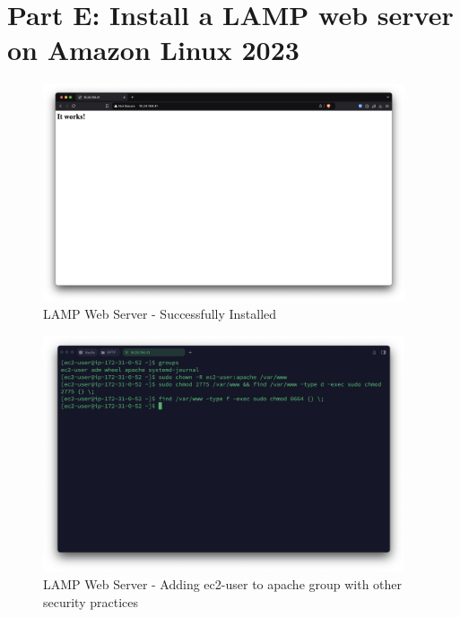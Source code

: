 \documentclass[a4paper,12pt]{article}
\begin{document}
\newpage

\section{Part E: Install a LAMP web server on Amazon Linux 2023}

\begin{figure}[H]
    \centering
    \includegraphics[width=0.95\textwidth]{lamp-server-1.png}
    \caption{LAMP Web Server - Successfully Installed}
    \label{fig:lamp1}
\end{figure}

\begin{figure}[H]
    \centering
    \includegraphics[width=0.95\textwidth]{lamp-server-2.png}
    \caption{LAMP Web Server - Adding ec2-user to apache group with other security practices}
    \label{fig:lamp2}
\end{figure}
\end{document}
